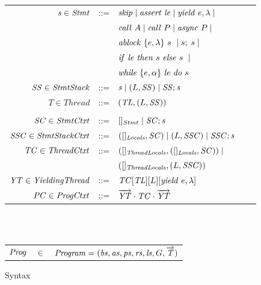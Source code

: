 \begin{figure}
~\\
~\\
\begin{tabular}{rclcl}
$\mathit{s} \in \mathit{Stmt}$ &::= & $\mathit{skip} \mid \mathit{assert}\ \mathit{le} \mid \mathit{yield}\ e,\lambda \mid$ \\
                  & & $\mathit{call}\ A \mid \mathit{call}\ P \mid \mathit{async}\ P \mid $\\
                  & & $\mathit{ablock}\ {\{e,\lambda\}}\ {s}\  \mid s;\;s \mid$\\
                  & & ${\mathit{if}\ {\mathit{le}}\ }{\mathit{then}\ {s}\ }{\mathit{else}\ {s}\ } \mid$ \\
                  & & $\mathit{while}\ \{{e,\alpha}\}\ {{\mathit{le}}\ } \mathit{do}\ {{s}\ }$ \\ 
$\mathit{SS} \in \mathit{StmtStack}$ &::= & $\mathit{s} \mid (L,\mathit{SS}) \mid \mathit{SS};\mathit{s}$ \\
$T \in \mathit{Thread}$ &::= &$(\mathit{TL}, (L, \mathit{SS}))$ \\
\\
$\mathit{SC} \in \mathit{StmtCtxt}$ &::= &$[]_{Stmt} \mid \mathit{SC};\mathit{s}$ \\
$\mathit{SSC} \in \mathit{StmtStackCtxt}$ &::= & $([]_{\mathit{Locals}}, \mathit{SC}) \mid (L,\mathit{SSC}) \mid \mathit{SSC};\mathit{s}$ \\
$\mathit{TC} \in \mathit{ThreadCtxt}$ &::= &$([]_{\mathit{ThreadLocals}}, ([]_{\mathit{Locals}}, \mathit{SC})) \mid$ \\
 & &$([]_{\mathit{ThreadLocals}}, (L, \mathit{SSC}))$ \\
$\mathit{YT} \in \mathit{YieldingThread}$ &::= &$\mathit{TC}[\mathit{TL}][L][\mathit{yield}\ e,\lambda]$ \\
$\mathit{PC} \in \mathit{ProgCtxt}$ &::= &$\overrightarrow{\mathit{YT}} \cdot \mathit{TC} \cdot \overrightarrow{\mathit{YT}}$ \\
\end{tabular}
~\\
~\\
\begin{tabular}{rcl}
$\mathit{Prog}$ & $\in$ & $\mathit{Program} = (\mathit{bs}, \mathit{as}, \mathit{ps}, \mathit{rs}, \mathit{ls}, G, \overrightarrow{\mathit{T}})$ \\
\end{tabular}
\setlength{\tabcolsep}{6pt}
\caption{Syntax}
\label{fig:syntax}
\end{figure}


